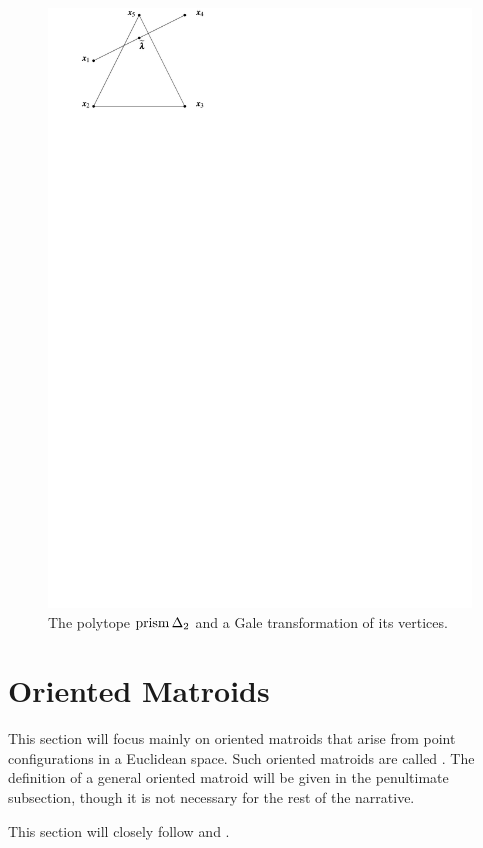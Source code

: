     \begin{figure}[hbt]
        \centering
            \includegraphics[width=.7\textwidth, page=29]{pictures.pdf}
        \caption{The polytope $\operatorname{prism}{\Delta_2}$ and a Gale transformation of its vertices.\label{Fig:TriPrismGale}}
    \end{figure}

\section{Oriented Matroids}

This section will focus mainly on oriented matroids that arise from point configurations in a Euclidean space.  Such oriented matroids are called .  The definition of a general oriented matroid will be given in the penultimate subsection, though it is not necessary for the rest of the narrative.

This section will closely follow \cite{ZieglerBook} and \cite{OrientedMatBook}.
